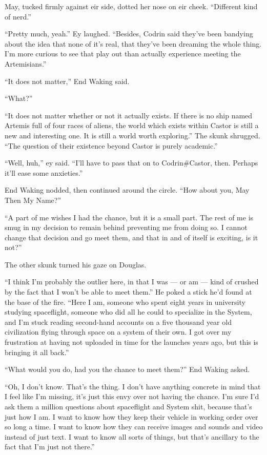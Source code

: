 May, tucked firmly against eir side, dotted her nose on eir cheek. ``Different kind of nerd.''

``Pretty much, yeah.'' Ey laughed. ``Besides, Codrin said they've been bandying about the idea that none of it's real, that they've been dreaming the whole thing. I'm more curious to see that play out than actually experience meeting the Artemisians.''

``It does not matter,'' End Waking said.
 
``What?''
 
``It does not matter whether or not it actually exists. If there is no ship named Artemis full of four races of aliens, the world which exists within Castor is still a new and interesting one. It is still a world worth exploring.'' The skunk shrugged. ``The question of their existence beyond Castor is purely academic.''
 
``Well, huh,'' ey said. ``I'll have to pass that on to Codrin\#Castor, then. Perhaps it'll ease some anxieties.''
 
End Waking nodded, then continued around the circle. ``How about you, May Then My Name?''

``A part of me wishes I had the chance, but it is a small part. The rest of me is smug in my decision to remain behind preventing me from doing so. I cannot change that decision and go meet them, and that in and of itself is exciting, is it not?''

The other skunk turned his gaze on Douglas.

``I think I'm probably the outlier here, in that I was — or am — kind of crushed by the fact that I won't be able to meet them.''  He poked a stick he'd found at the base of the fire. ``Here I am, someone who spent eight years in university studying spaceflight, someone who did all he could to specialize in the System, and I'm stuck reading second-hand accounts on a five thousand year old civilization flying through space on a system of their own. I got over my frustration at having not uploaded in time for the launches years ago, but this is bringing it all back.''

``What would you do, had you the chance to meet them?'' End Waking asked.

``Oh, I don't know. That's the thing. I don't have anything concrete in mind that I feel like I'm missing, it's just this envy over not having the chance. I'm sure I'd ask them a million questions about spaceflight and System shit, because that's just how I am. I want to know how they keep their vehicle in working order over so long a time. I want to know how they can receive images and sounds and video instead of just text. I want to know all sorts of things, but that's ancillary to the fact that I'm just not there.''

